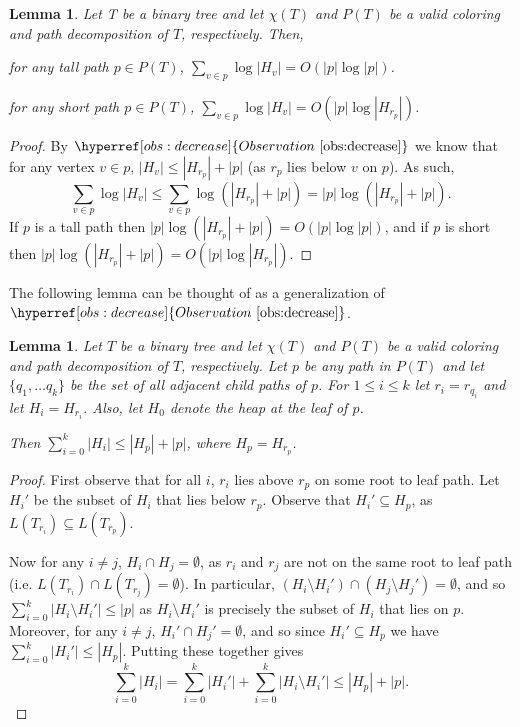 \documentclass[11pt]{article}
\newtheorem{lemma}[theorem]{Lemma}
\theoremstyle{definition}
\newcommand{\Obs}[1]{\hyperref[obs:#1]{Observation~\ref*{obs:#1}}} %
\begin{document}
{{\begin{lemma}
\label{lem:pathBounds}
 Let T be a binary tree and let $\chi(T)$ and $P(T)$ be a valid coloring and path decomposition of $T$, respectively.
 Then, 
 \begin{compactenum}
  \item for any tall path $p\in P(T)$, $\sum_{v\in p} \log |H_v| = O(|p| \log |p|)$.
  \item for any short path $p\in P(T)$, $\sum_{v\in p} \log |H_v| = O(|p| \log |H_{r_p}|)$.
 \end{compactenum}
\end{lemma}
\begin{proof}
 By $\Obs{decrease}$ we know that for any vertex $v\in p$, $|H_v|\leq |H_{r_p}| + |p|$ (as $r_p$ lies below $v$ on $p$).
 As such, 
 \[
 \sum_{v\in p} \log |H_v| \leq \sum_{v\in p} \log(|H_{r_p}| + |p|)  = |p| \log (|H_{r_p}| + |p|).
 \]
 If $p$ is a tall path then $|p| \log (|H_{r_p}| + |p|) = O(|p| \log |p|)$, and if $p$ is short then 
 $|p| \log (|H_{r_p}| + |p|) = O(|p| \log |H_{r_p}| )$.
\end{proof}

The following lemma can be thought of as a generalization of $\Obs{decrease}$.

\begin{lemma}
\label{lem:adjacent}
 Let $T$ be a binary tree and let $\chi(T)$ and $P(T)$ be a valid coloring and path decomposition of $T$, respectively.
 Let $p$ be any path in $P(T)$ and let $\{q_1, \dots q_k\}$ be the set of all adjacent child paths of $p$.
 For $1\leq i\leq k$ let $r_i = r_{q_i}$ and let $H_i = H_{r_i}$.
 Also, let $H_0$ denote the heap at the leaf of $p$.
 
 Then $\sum_{i=0}^k |H_i| \leq |H_p|+|p|$, where $H_p = H_{r_p}$.
\end{lemma}
\begin{proof} 
 First observe that for all $i$, $r_{i}$ lies above $r_p$ on some root to leaf path. 
 Let $H_i'$ be the subset of $H_i$ that lies below $r_p$.  Observe that $H_i'\subseteq H_p$, as $L(T_{r_i})\subseteq L(T_{r_p})$.
  
 Now for any $i\neq j$, $H_i \cap H_j = \emptyset$, as $r_{i}$ and $r_{j}$ are not on the same root to leaf path (i.e. $L(T_{r_i}) \cap L(T_{r_j}) = \emptyset$).
 In particular, $(H_i\setminus H_i') \cap (H_j \setminus H_j') = \emptyset$, and so $\sum_{i=0}^k |H_i\setminus H_i'| \leq |p|$ 
 as $H_i\setminus H_i'$ is precisely the subset of $H_i$ that lies on $p$.
 Moreover, for any $i\neq j$, $ H_i' \cap H_j' = \emptyset$, and so since $H_i'\subseteq H_p$ we have $\sum_{i=0}^k |H_i'|\leq |H_p|$.
 Putting these together gives
 \[
  \sum_{i=0}^k |H_i| = \sum_{i=0}^k |H_i'| + \sum_{i=0}^k |H_i\setminus H_i'| \leq |H_p|+|p|.
 \]
\end{proof}

}}
\end{document}
